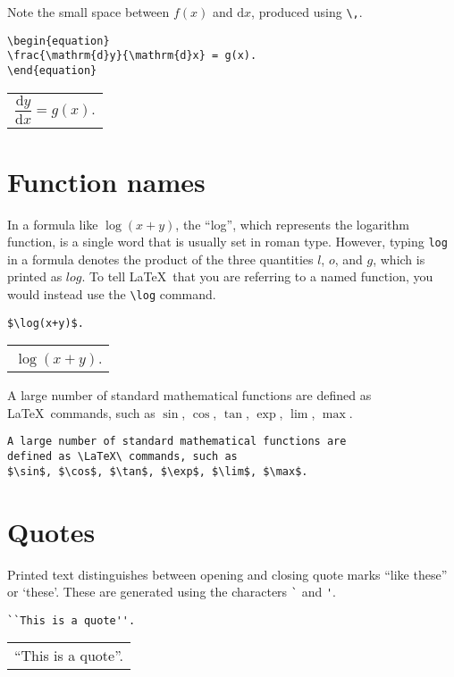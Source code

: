 \documentclass[a4paper]{tufte-handout}
\begin{document}
Note the small space between $f(x)$ and $\mathrm{d}x$, produced using \lstinline{\,}.

\begin{lstlisting}
\begin{equation}
\frac{\mathrm{d}y}{\mathrm{d}x} = g(x).
\end{equation}
\end{lstlisting}
\begin{tabular}{|p{10cm}}
\begin{equation*}
\frac{\mathrm{d}y}{\mathrm{d}x} = g(x).
\end{equation*}
\end{tabular}

\section{Function names}
In a formula like $\log(x +y)$, the ``log'', which represents the logarithm function, is a single word that is usually set in roman type. However, typing \lstinline{log} in a formula denotes the product of the three quantities $l$, $o$, and $g$, which is printed as $log$. To tell \LaTeX\ that you are referring to a named function, you would instead use the \lstinline{\log} command.
\begin{lstlisting}
$\log(x+y)$.
\end{lstlisting}
\begin{tabular}{|p{10cm}}
$\log(x+y)$.
\end{tabular}

A large number of standard mathematical functions are defined as \LaTeX\ commands, such as $\sin$, $\cos$, $\tan$, $\exp$, $\lim$, $\max$.
\begin{lstlisting}
A large number of standard mathematical functions are 
defined as \LaTeX\ commands, such as 
$\sin$, $\cos$, $\tan$, $\exp$, $\lim$, $\max$.
\end{lstlisting}

\section{Quotes}
Printed text distinguishes between opening and closing quote marks ``like these'' or `these'. These are generated using the characters \lstinline{`} and \lstinline{'}.
\begin{lstlisting}
``This is a quote''.
\end{lstlisting}
\begin{tabular}{|p{10cm}}
``This is a quote''.
\end{tabular}
\end{document}
